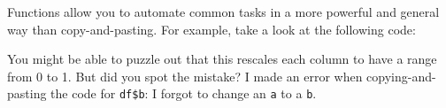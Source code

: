 \documentclass[]{book}
\newenvironment{Shaded}{\begin{snugshade}}{\end{snugshade}}
\newcommand{\DataTypeTok}[1]{\textcolor[rgb]{0.13,0.29,0.53}{#1}}
\newcommand{\DecValTok}[1]{\textcolor[rgb]{0.00,0.00,0.81}{#1}}
\newcommand{\KeywordTok}[1]{\textcolor[rgb]{0.13,0.29,0.53}{\textbf{#1}}}
\newcommand{\NormalTok}[1]{#1}
\newcommand{\OperatorTok}[1]{\textcolor[rgb]{0.81,0.36,0.00}{\textbf{#1}}}
\newcommand{\StringTok}[1]{\textcolor[rgb]{0.31,0.60,0.02}{#1}}
\begin{document}
Functions allow you to automate common tasks in a more powerful and general way than copy-and-pasting. For example, take a look at the following code:

\begin{Shaded}
\end{Shaded}

You might be able to puzzle out that this rescales each column to have a range from 0 to 1. But did you spot the mistake? I made an error when copying-and-pasting the code for \texttt{df\$b}: I forgot to change an \texttt{a} to a \texttt{b}.
\end{document}
